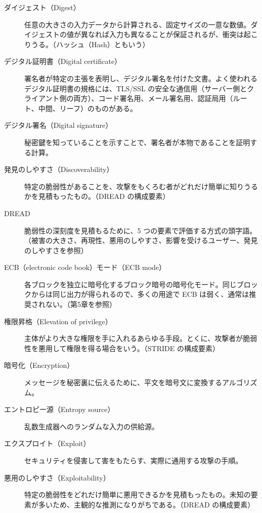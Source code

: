 \documentclass[uplatex]{jsarticle}
\begin{document}
\begin{description}
\item[ダイジェスト（Digest）]
任意の大きさの入力データから計算される、固定サイズの一意な数値。ダイジェストの値が異なれば入力も異なることが保証されるが、衝突は起こりうる。（ハッシュ（Hash）ともいう）

\item[デジタル証明書（Digital certificate）]
署名者が特定の主張を表明し、デジタル署名を付けた文書。よく使われるデジタル証明書の規格には、TLS/SSL の安全な通信用（サーバー側とクライアント側の両方）、コード署名用、メール署名用、認証局用（ルート、中間、リーフ）のものがある。

\item[デジタル署名（Digital signature）]
秘密鍵を知っていることを示すことで、署名者が本物であることを証明する計算。

\item[発見のしやすさ（Discoverability）]
特定の脆弱性があることを、攻撃をもくろむ者がどれだけ簡単に知りうるかを見積もったもの。（DREAD の構成要素）

\item[DREAD]
脆弱性の深刻度を見積もるために、5 つの要素で評価する方式の頭字語。（被害の大きさ、再現性、悪用のしやすさ、影響を受けるユーザー、発見のしやすさを参照）

\item[ECB（electronic code book）モード（ECB mode）]
各ブロックを独立に暗号化するブロック暗号の暗号化モード。同じブロックからは同じ出力が得られるので、多くの用途で ECB は弱く、通常は推奨されない。（第5章を参照）

\item[権限昇格（Elevation of privilege）]
主体がより大きな権限を手に入れるあらゆる手段。とくに、攻撃者が脆弱性を悪用して権限を得る場合をいう。（STRIDE の構成要素）

\item[暗号化（Encryption）]
メッセージを秘密裏に伝えるために、平文を暗号文に変換するアルゴリズム。

\item[エントロピー源（Entropy source）]
乱数生成器へのランダムな入力の供給源。

\item[エクスプロイト（Exploit）]
セキュリティを侵害して害をもたらす、実際に通用する攻撃の手順。

\item[悪用のしやすさ（Exploitability）]
特定の脆弱性をどれだけ簡単に悪用できるかを見積もったもの。未知の要素が多いため、主観的な推測になりがちである。（DREAD の構成要素）


\end{description}
\end{document}
